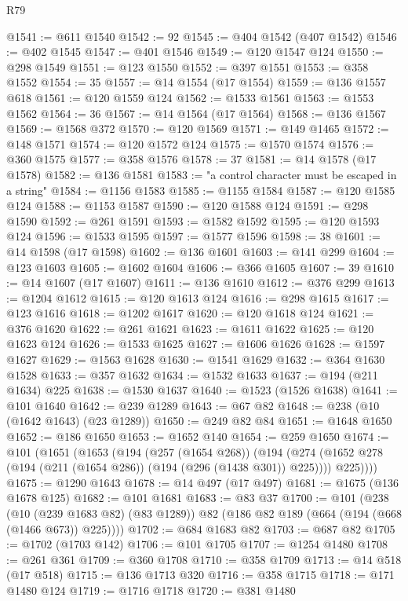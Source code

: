 \begin{lexlean}{R79}
\begin{coremodule}
@1541 := @611 @1540
@1542 := 92
@1545 := @404 @1542 (@407 @1542)
@1546 := @402 @1545
@1547 := @401 @1546
@1549 := @120 @1547 @124
@1550 := @298 @1549
@1551 := @123 @1550
@1552 := @397 @1551
@1553 := @358 @1552
@1554 := 35
@1557 := @14 @1554 (@17 @1554)
@1559 := @136 @1557 @618
@1561 := @120 @1559 @124
@1562 := @1533 @1561
@1563 := @1553 @1562
@1564 := 36
@1567 := @14 @1564 (@17 @1564)
@1568 := @136 @1567
@1569 := @1568 @372
@1570 := @120 @1569
@1571 := @149 @1465
@1572 := @148 @1571
@1574 := @120 @1572 @124
@1575 := @1570 @1574
@1576 := @360 @1575
@1577 := @358 @1576
@1578 := 37
@1581 := @14 @1578 (@17 @1578)
@1582 := @136 @1581
@1583 := "a control character must be escaped in a string"
@1584 := @1156 @1583
@1585 := @1155 @1584
@1587 := @120 @1585 @124
@1588 := @1153 @1587
@1590 := @120 @1588 @124
@1591 := @298 @1590
@1592 := @261 @1591
@1593 := @1582 @1592
@1595 := @120 @1593 @124
@1596 := @1533 @1595
@1597 := @1577 @1596
@1598 := 38
@1601 := @14 @1598 (@17 @1598)
@1602 := @136 @1601
@1603 := @141 @299
@1604 := @123 @1603
@1605 := @1602 @1604
@1606 := @366 @1605
@1607 := 39
@1610 := @14 @1607 (@17 @1607)
@1611 := @136 @1610
@1612 := @376 @299
@1613 := @1204 @1612
@1615 := @120 @1613 @124
@1616 := @298 @1615
@1617 := @123 @1616
@1618 := @1202 @1617
@1620 := @120 @1618 @124
@1621 := @376 @1620
@1622 := @261 @1621
@1623 := @1611 @1622
@1625 := @120 @1623 @124
@1626 := @1533 @1625
@1627 := @1606 @1626
@1628 := @1597 @1627
@1629 := @1563 @1628
@1630 := @1541 @1629
@1632 := @364 @1630 @1528
@1633 := @357 @1632
@1634 := @1532 @1633
@1637 := @194 (@211 @1634) @225
@1638 := @1530 @1637
@1640 := @1523 (@1526 @1638)
@1641 := @101 @1640
@1642 := @239 @1289
@1643 := @67 @82
@1648 := @238 (@10 (@1642 @1643) (@23 @1289))
@1650 := @249 @82 @84
@1651 := @1648 @1650
@1652 := @186 @1650
@1653 := @1652 @140
@1654 := @259 @1650
@1674 := @101
    (@1651
      (@1653
        (@194
          (@257 (@1654 @268))
          (@194
            (@274 (@1652 @278 (@194 (@211 (@1654 @286)) (@194 (@296 (@1438 @301)) @225))))
            @225))))
@1675 := @1290 @1643
@1678 := @14 @497 (@17 @497)
@1681 := @1675 (@136 @1678 @125)
@1682 := @101 @1681
@1683 := @83 @37
@1700 := @101
    (@238
      (@10 (@239 @1683 @82) (@83 @1289))
      @82
      (@186 @82 @189 (@664 (@194 (@668 (@1466 @673)) @225))))
@1702 := @684 @1683 @82
@1703 := @687 @82
@1705 := @1702 (@1703 @142)
@1706 := @101 @1705
@1707 := @1254 @1480
@1708 := @261 @361
@1709 := @360 @1708
@1710 := @358 @1709
@1713 := @14 @518 (@17 @518)
@1715 := @136 @1713 @320
@1716 := @358 @1715
@1718 := @171 @1480 @124
@1719 := @1716 @1718
@1720 := @381 @1480

\end{coremodule}
\end{lexlean}
